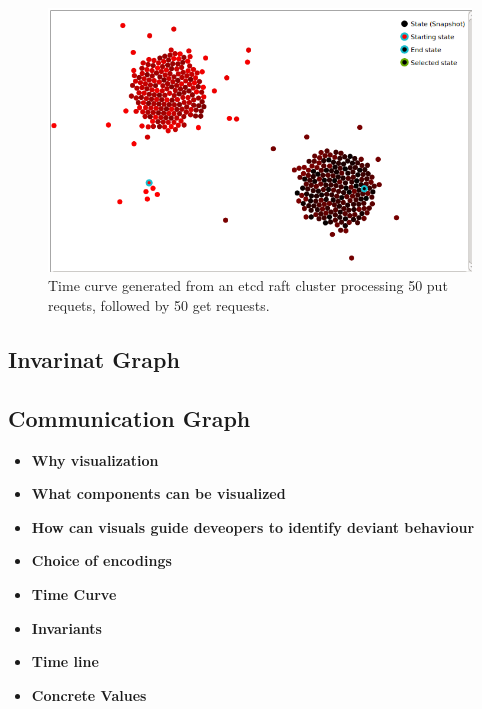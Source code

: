 \begin{figure}[h]
    \includegraphics[width=\linewidth]{fig/put-get-curve}%
    \caption{Time curve generated from an etcd raft cluster processing 50 put requets, followed by 50 get requests.\label{fig:put-get-curve}}%
\end{figure}
    


\subsection{Invarinat Graph}
\label{invariant-graph}

\subsection{Communication Graph}
\label{communication-graph}

\begin{itemize}
    \item \textbf{Why visualization}
    \item \textbf{What components can be visualized}
    \item \textbf{How can visuals guide deveopers to identify deviant behaviour}
    \item \textbf{Choice of encodings}
    \item \textbf{Time Curve}
    \item \textbf{Invariants}
    \item \textbf{Time line}
    \item \textbf{Concrete Values}
\end{itemize}
